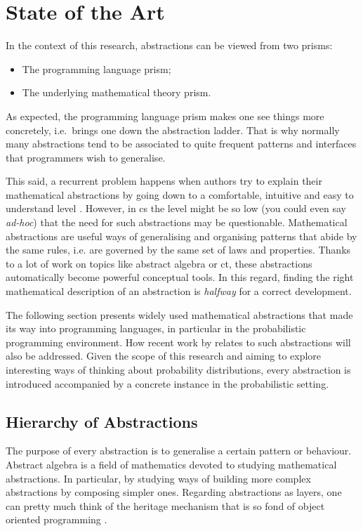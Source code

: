 \documentclass[
  oneside,
  11pt, a4paper,
  footinclude=true,
  headinclude=true,
  cleardoublepage=empty
]{scrbook}
\theoremstyle{definition}
\theoremstyle{definition}
\begin{document}
	\section{State of the Art}\label{sec-state-art}
	
	In the context of this research, abstractions can be viewed from two prisms:
	\begin{itemize}
	   \item The programming language prism;
	   \item The underlying mathematical theory prism.
	\end{itemize}{}
	    
	As expected, the programming language prism makes one see things more concretely, i.e.\ brings one down the abstraction ladder. That is why normally many abstractions tend to be associated to quite frequent patterns and interfaces that programmers wish to generalise.
	    
	This said, a recurrent problem happens when authors try to explain their mathematical abstractions by going down to a comfortable, intuitive and easy to understand level \citep{DBLP:journals/corr/abs-1803-10195}. However, in \gls{cs} the level might be so low (you could even say \emph{ad-hoc}) that the need for such abstractions may be questionable. Mathematical abstractions are useful ways of generalising and organising patterns that abide by the same rules, i.e. are governed by the same set of laws and properties. Thanks to a lot of work on topics like abstract algebra or \gls{ct}, these abstractions automatically become powerful conceptual tools. In this regard, finding the right mathematical description of an abstraction is \emph{halfway} for a correct development.
	    
	The following section presents widely used mathematical abstractions that made its way into programming languages, in particular in the probabilistic programming environment. How recent work by \cite{andrey2019selective} relates to such abstractions will also be addressed. Given the scope of this research and aiming to explore interesting ways of thinking about probability distributions, every abstraction is introduced accompanied by a concrete instance in the probabilistic setting.
	    
	    \subsection{Hierarchy of Abstractions}
	    
	The purpose of every abstraction is to generalise a certain pattern or behaviour. Abstract algebra is a field of mathematics devoted to studying mathematical abstractions. In particular, by studying ways of building more complex abstractions by composing simpler ones. Regarding abstractions as layers, one can pretty much think of the heritage mechanism that is so fond of object oriented programming \citep{Liskov:1987:KAD:62139.62141}.
	    
\end{document}
